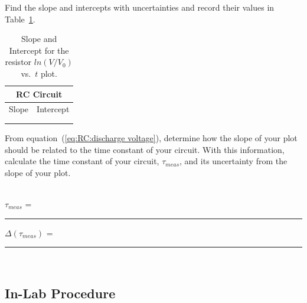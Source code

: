 \noindent  Find the slope and intercepts with uncertainties and 
record their values in Table~\ref{tab:RC:slope1}. 
\begin{table}[htb]
\begin{center}
\begin{tabular}{|c|c|}
\hline
\multicolumn{2}{|c|}{RC Circuit} \\
\hline
Slope & Intercept \\
\hline
\hspace*{5cm} & \hspace*{5cm} \\
& \\
\hline
\end{tabular}
\end{center}
\caption{Slope and Intercept for the resistor $ln(V/V_0)$ vs.\ $t$ plot.}
\label {tab:RC:slope1}
\end{table}

\noindent From equation~(\ref{eq:RC:discharge voltage}),
 determine how the slope of your plot should be
related to the time constant of your circuit. With this information, 
calculate the time constant of your circuit, 
$\tau _{meas}$, and its uncertainty from the slope of your plot. \\
\vspace*{2cm} \\
\begin{center}
 $\tau_{meas}$ = ~ \rule{3cm}{.1mm} \hspace*{1cm} $\Delta(\tau_{meas})$ = ~ \rule{3cm}{.1mm} \\
\end{center}
\subsection{In-Lab Procedure}
